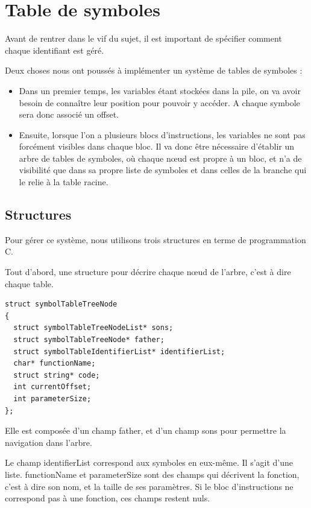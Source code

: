 \vspace{0.5cm}
\section{Table de symboles}

\vspace{0.5cm}
Avant de rentrer dans le vif du sujet, il est important de spécifier comment chaque identifiant est géré.

\vspace{0.5cm}
Deux choses nous ont poussés à implémenter un système de tables de symboles :
\begin{itemize}
\item Dans un premier temps, les variables étant stockées dans la pile, on va avoir besoin de connaître leur position pour pouvoir y accéder. A chaque symbole sera donc associé un offset.
\item Ensuite, lorsque l'on a plusieurs blocs d'instructions, les variables ne sont pas forcément visibles dans chaque bloc. Il va donc être nécessaire d'établir un arbre de tables de symboles, où chaque n\oe{}ud est propre à un bloc, et n'a de visibilité que dans sa propre liste de symboles et dans celles de la branche qui le relie à la table racine.
\end{itemize}


\subsection*{Structures}

\vspace{0.5cm}
Pour gérer ce système, nous utilisons trois structures en terme de programmation C.

\vspace{0.5cm}
Tout d'abord, une structure pour décrire chaque n\oe{}ud de l'arbre, c'est à dire chaque table. 

\begin{verbatim}
struct symbolTableTreeNode
{
  struct symbolTableTreeNodeList* sons;
  struct symbolTableTreeNode* father;
  struct symbolTableIdentifierList* identifierList;
  char* functionName;
  struct string* code;
  int currentOffset;
  int parameterSize;
};
\end{verbatim} 

Elle est composée d'un champ father, et d'un champ sons pour permettre la navigation dans l'arbre. 

Le champ identifierList correspond aux symboles en eux-même. Il s'agit d'une liste. 
functionName et parameterSize sont des champs qui décrivent la fonction, c'est à dire son nom, et la taille de ses paramètres. Si le bloc d'instructions ne correspond pas à une fonction, ces champs restent nuls.


